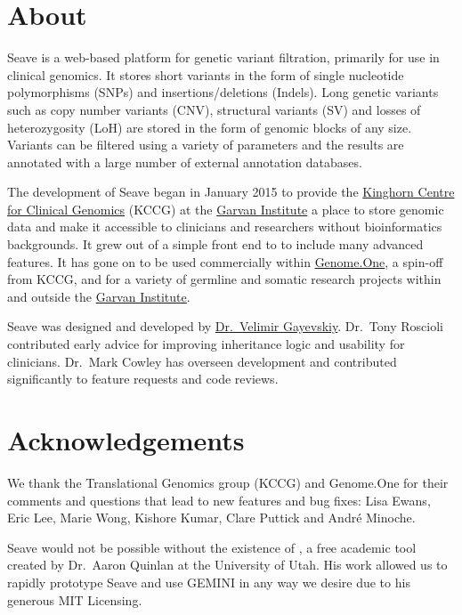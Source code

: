 
\newpage

\section{About}

Seave is a web-based platform for genetic variant filtration, primarily for use in clinical genomics. It stores short variants in the form of single nucleotide polymorphisms (SNPs) and insertions/deletions (Indels). Long genetic variants such as copy number variants (CNV), structural variants (SV) and losses of heterozygosity (LoH) are stored in the form of genomic blocks of any size. Variants can be filtered using a variety of parameters and the results are annotated with a large number of external annotation databases.

The development of Seave began in January 2015 to provide the \href{https://garvan.org.au/kccg}{Kinghorn Centre for Clinical Genomics} (KCCG) at the \href{http://garvan.org.au}{Garvan Institute} a place to store genomic data and make it accessible to clinicians and researchers without bioinformatics backgrounds. It grew out of a simple front end to \GEMINI to include many advanced features. It has gone on to be used commercially within \href{https://genome.one}{Genome.One}, a spin-off from KCCG, and for a variety of germline and somatic research projects within and outside the \href{http://garvan.org.au}{Garvan Institute}. 

Seave was designed and developed by \href{https://www.vel.nz}{Dr.~Velimir Gayevskiy}. Dr.~Tony Roscioli contributed early advice for improving inheritance logic and usability for clinicians. Dr.~Mark Cowley has overseen development and contributed significantly to feature requests and code reviews.


\section{Acknowledgements}

We thank the Translational Genomics group (KCCG) and Genome.One for their comments and questions that lead to new features and bug fixes: Lisa Ewans, Eric Lee, Marie Wong, Kishore Kumar, Clare Puttick and André Minoche.

Seave would not be possible without the existence of \GEMINI, a free academic tool created by Dr.~Aaron Quinlan at the University of Utah. His work allowed us to rapidly prototype Seave and use GEMINI in any way we desire due to his generous MIT Licensing.